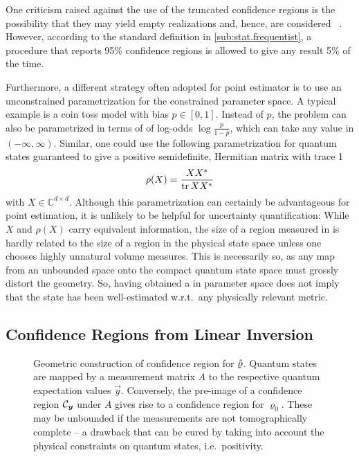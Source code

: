 One criticism raised against the use of the truncated confidence regions is the possibility that they may yield empty realizations and, hence, are considered ~\cite{Feldman_1998_Unified}.
However, according to the standard definition in \cref{sub:stat.frequentist}, a procedure that reports 95\% confidence regions is allowed to give any result 5\% of the time.

Furthermore, a different strategy often adopted for point estimator is to use an unconstrained parametrization for the constrained parameter space.
A typical example is a coin toss model with bias $p \in [0, 1]$.
Instead of $p$, the problem can also be parametrized in terms of of log-odds $\log\frac{p}{1 - p}$, which can take any value in $(-\infty,\infty)$.
Similar, one could use the following parametrization for quantum states guaranteed to give a positive semidefinite, Hermitian matrix with trace 1
\[
  \rho(X) = \frac{X {{X}^\ast}}{\operatorname{tr} X {{X}^\ast}}
\]
with $X \in \mathbb{C}^{d \times d}$.
Although this parametrization can certainly be advantageous for point estimation, it is unlikely to be helpful for uncertainty quantification:
While $X$ and $\rho(X)$ carry equivalent information, the size of a region measured in  is hardly related to the size of a region in the physical state space unless one chooses highly unnatural volume measures.
This is necessarily so, as any map from an unbounded space onto the compact quantum state space must grossly distort the geometry.
So, having obtained a  in parameter space does not imply that the state has been well-estimated w.r.t.\ any physically relevant metric.

\subsection{Confidence Regions from Linear Inversion}
\label{sub:ortho.linear_inversion}

\begin{figure*}
  \centering
  
  \caption{\label{fig:ortho.geometry}
    Geometric construction of confidence region for $\hat{\varrho}$.
    Quantum states are mapped by a measurement matrix $A$ to the respective quantum expectation values $\vec y$.
    Conversely, the pre-image of a confidence region $\mathcal{C}_{\boldsymbol{y}}$ under $A$ gives rise to a confidence region for $\varrho_0$.
    These may be unbounded if the measurements are not tomographically complete -- a drawback that can be cured by taking into account the physical constraints on quantum states, i.e.\ positivity.
  }
\end{figure*}



